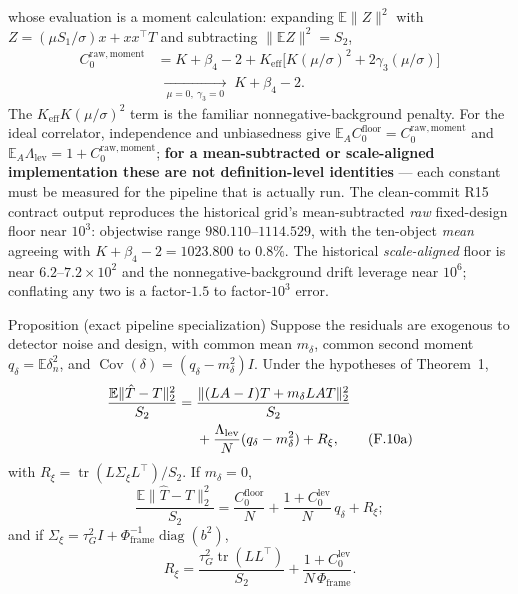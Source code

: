 whose evaluation is a moment calculation: expanding $\mathbb{E}\|Z\|^2$ with $Z=(\mu S_1/\sigma)x+xx^\top T$ and subtracting $\|\mathbb{E}Z\|^2=S_2$,
\begin{align*}
C_0^{\mathrm{raw,moment}}&=K+\beta_4-2+K_{\mathrm{eff}}\big[K(\mu/\sigma)^2+2\gamma_3(\mu/\sigma)\big]\\
&\;\xrightarrow[\ \mu=0,\ \gamma_3=0\ ]{}\; K+\beta_4-2. \tag{F.10}
\end{align*}
The $K_{\mathrm{eff}}K(\mu/\sigma)^2$ term is the familiar nonnegative-background penalty. For the ideal correlator, independence and unbiasedness give $\mathbb{E}_AC_0^{\mathrm{floor}}=C_0^{\mathrm{raw,moment}}$ and $\mathbb{E}_A\Lambda_{\mathrm{lev}}=1+C_0^{\mathrm{raw,moment}}$; \textbf{for a mean-subtracted or scale-aligned implementation these are not definition-level identities} --- each constant must be measured for the pipeline that is actually run. The clean-commit R15 contract output reproduces the historical grid's mean-subtracted \emph{raw} fixed-design floor near $10^3$: objectwise range $980.110$--$1114.529$, with the ten-object \emph{mean} agreeing with $K+\beta_4-2=1023.800$ to $0.8\%$. The historical \emph{scale-aligned} floor is near $6.2$--$7.2\times10^2$ and the nonnegative-background drift leverage near $10^6$; conflating any two is a factor-$1.5$ to factor-$10^3$ error.

\begin{namedthm}{Proposition (exact pipeline specialization)}
Suppose the residuals are exogenous to detector noise and design, with common mean $m_\delta$, common second moment $q_\delta=\mathbb{E}\delta_n^2$, and $\operatorname{Cov}(\delta)=(q_\delta-m_\delta^2)I$. Under the hypotheses of Theorem~1,
\begin{align}
\frac{\mathbb{E}\|\hat T-T\|_2^2}{S_2}
={}&\frac{\|(LA-I)T+m_\delta LAT\|_2^2}{S_2}\notag\\
&+\frac{\Lambda_{\mathrm{lev}}}{N}(q_\delta-m_\delta^2)+R_\xi,
\tag{F.10a}
\end{align}
with $R_\xi=\operatorname{tr}(L\Sigma_\xi L^\top)/S_2$. If $m_\delta=0$,
\begin{equation}
\frac{\mathbb{E}\|\hat T-T\|_2^2}{S_2}
=\frac{C_0^{\mathrm{floor}}}{N}
+\frac{1+C_0^{\mathrm{lev}}}{N}\,q_\delta+R_\xi ;
\tag{F.10b}
\end{equation}
and if $\Sigma_\xi=\tau_G^2I+\Phi_{\mathrm{frame}}^{-1}\operatorname{diag}(b^2)$,
\begin{equation}
R_\xi=\frac{\tau_G^2\operatorname{tr}(LL^\top)}{S_2}
+\frac{1+C_0^{\mathrm{lev}}}{N\,\Phi_{\mathrm{frame}}}.
\tag{F.10c}
\end{equation}
\end{namedthm}

